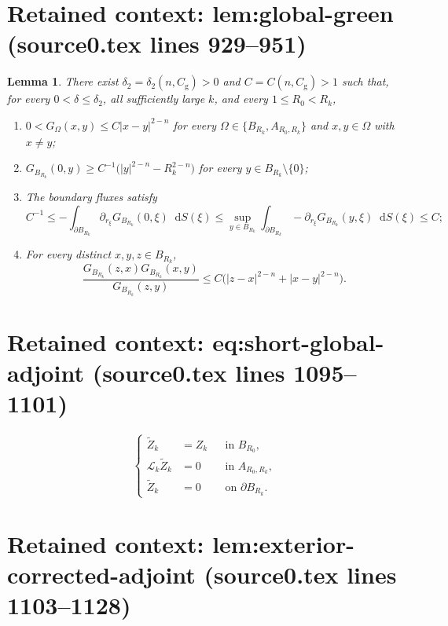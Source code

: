 \documentclass[10pt,a4paper]{amsart}
\newcommand{\dd}{\mathop{}\!\mathrm{d}}
\theoremstyle{plain}
\newtheorem{lemma}[theorem]{Lemma}
\theoremstyle{remark}
\begin{document}
\section*{Retained context: lem:global-green (source0.tex lines 929--951)}

\begin{lemma} \label{lem:global-green}
There exist $\delta_2=\delta_2(n,C_{\mathrm g})>0$ and $C=C(n,C_{\mathrm g})>1$ such that, for every
$0<\delta\le\delta_2$, all sufficiently large $k$,  and every $1\le R_0<R_k$,

\begin{enumerate}[label=\emph{(\roman*)}]
\item
$0<G_\Omega(x,y)\le C|x-y|^{2-n}$ for every
$\Omega\in\{B_{R_k},A_{R_0,R_k}\}$ and $x,y\in\Omega$ with $x\ne y$;
\item
$G_{B_{R_k}}(0,y)\ge C^{-1}\bigl(|y|^{2-n}-R_k^{2-n}\bigr)$ for every
$y\in B_{R_k}\setminus\{0\}$;
\item The boundary fluxes satisfy
\[
C^{-1}\le-\int_{\partial B_{R_k}}\partial_{r_\xi}G_{B_{R_k}}(0,\xi)\dd S(\xi)
\le\sup_{y\in B_{R_k}}\int_{\partial B_{R_k}}-\partial_{r_\xi}G_{B_{R_k}}(y,\xi)\dd S(\xi)\le C;
\]
\item For every distinct $x,y,z\in B_{R_k}$,
\[
\frac{G_{B_{R_k}}(z,x)G_{B_{R_k}}(x,y)}{G_{B_{R_k}}(z,y)}
\le C\bigl(|z-x|^{2-n}+|x-y|^{2-n}\bigr).
\]
\end{enumerate}
 \end{lemma}


\section*{Retained context: eq:short-global-adjoint (source0.tex lines 1095--1101)}

\begin{equation}\label{eq:short-global-adjoint}
 {\left\{\begin{aligned}
  \widetilde Z_k&=Z_k&&\text{in }B_{R_0},\\
  \mathcal L_k\widetilde Z_k&=0&&\text{in }A_{R_0,R_k},\\
  \widetilde Z_k&=0&&\text{on }\partial B_{R_k}.
 \end{aligned}\right.}
\end{equation}


\section*{Retained context: lem:exterior-corrected-adjoint (source0.tex lines 1103--1128)}
\end{document}
